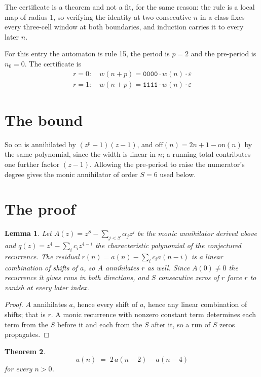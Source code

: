 \documentclass[11pt,a4paper]{article}
\theoremstyle{plain}
\newtheorem{theorem}{Theorem}
\newtheorem{lemma}[theorem]{Lemma}
\theoremstyle{definition}
\begin{document}
The certificate is a theorem and not a fit, for the same reason: the rule is a local map of
radius $1$, so verifying the identity at two consecutive $n$ in a class fixes every three-cell
window at both boundaries, and induction carries it to every later $n$.

For this entry the automaton is rule 15, the period is $p=2$ and the pre-period is $n_0=0$.
The certificate is
\begin{gather*}
r=0:\quad w(n+p) = \texttt{0000} \cdot w(n) \cdot \varepsilon \\
r=1:\quad w(n+p) = \texttt{1111} \cdot w(n) \cdot \varepsilon
\end{gather*}

\section{The bound}

So
$\mathrm{on}$ is annihilated by $(z^p-1)(z-1)$, and $\mathrm{off}(n)=2n+1-\mathrm{on}(n)$ by
the same polynomial, since the width is linear in $n$; a running total contributes one further
factor $(z-1)$. Allowing the pre-period to raise the numerator's degree gives the monic
annihilator of order $S=6$ used below.

\section{The proof}

\begin{lemma}\label{lem:crit}
Let $A(z)=z^S-\sum_{j<S}\alpha_jz^{j}$ be the monic annihilator derived above and
$q(z)=z^{4}-\sum_ic_iz^{4-i}$ the characteristic polynomial of the conjectured
recurrence. The residual $r(n)=a(n)-\sum_ic_ia(n-i)$ is a linear combination of shifts of $a$,
so $A$ annihilates $r$ as well. Since $A(0)\ne0$ the recurrence it gives runs in both
directions, and $S$ consecutive zeros of $r$ force $r$ to vanish at every later index.
\end{lemma}

\begin{proof}
$A$ annihilates $a$, hence every shift of $a$, hence any linear combination of shifts; that is
$r$. A monic recurrence with nonzero constant term determines each term from the $S$ before it
and each from the $S$ after it, so a run of $S$ zeros propagates.
\end{proof}

\begin{theorem}
\[
a(n)\;=\;2\,a(n-2) - a(n-4)
\]
for every $n>0$.
\end{theorem}
\end{document}

